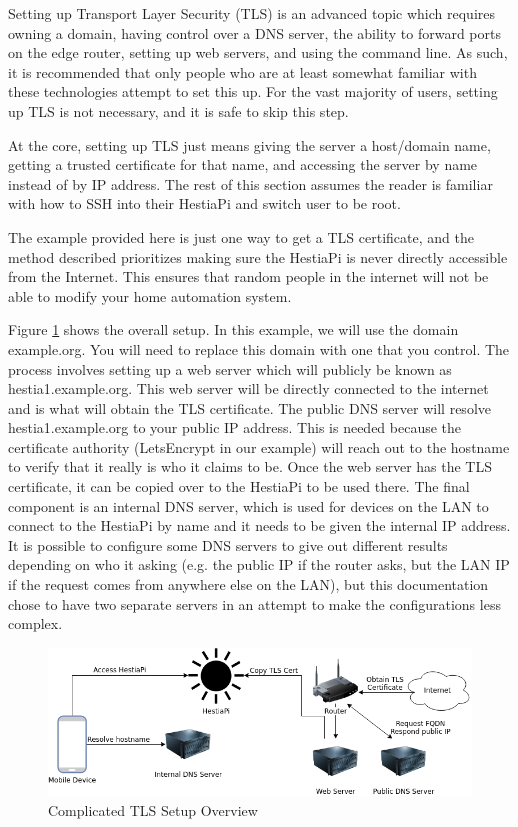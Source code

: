 Setting up Transport Layer Security (TLS) is an advanced topic which requires
owning a domain, having control over a DNS server, the ability to forward ports
on the edge router, setting up web servers, and using the command line.  As
such, it is recommended that only people who are at least somewhat familiar
with these technologies attempt to set this up.  For the vast majority of
users, setting up TLS is not necessary, and it is safe to skip this step.

At the core, setting up TLS just means giving the server a host/domain name,
getting a trusted certificate for that name, and accessing the server by name
instead of by IP address.  The rest of this section assumes the reader is
familiar with how to SSH into their HestiaPi and switch user to be root.

The example provided here is just one way to get a TLS certificate, and the
method described prioritizes making sure the HestiaPi is never directly
accessible from the Internet.  This ensures that random people in the internet
will not be able to modify your home automation system.

Figure \ref{fig:tls-overview} shows the overall setup.  In this example, we
will use the domain example.org.  You will need to replace this domain with one
that you control.  The process involves setting up a web server which will
publicly be known as hestia1.example.org.  This web server will be directly
connected to the internet and is what will obtain the TLS certificate.  The
public DNS server will resolve hestia1.example.org to your public IP address.
This is needed because the certificate authority (LetsEncrypt in our example)
will reach out to the hostname to verify that it really is who it claims to be.
Once the web server has the TLS certificate, it can be copied over to the
HestiaPi to be used there.  The final component is an internal DNS server,
which is used for devices on the LAN to connect to the HestiaPi by name and it
needs to be given the internal IP address.  It is possible to configure some
DNS servers to give out different results depending on who it asking (e.g. the
public IP if the router asks, but the LAN IP if the request comes from anywhere
else on the LAN), but this documentation chose to have two separate servers in
an attempt to make the configurations less complex.

\begin{figure}
  \includegraphics[width=\textwidth]{img/tls_overview.png}
  \caption{Complicated TLS Setup Overview}
  \label{fig:tls-overview}
\end{figure}

